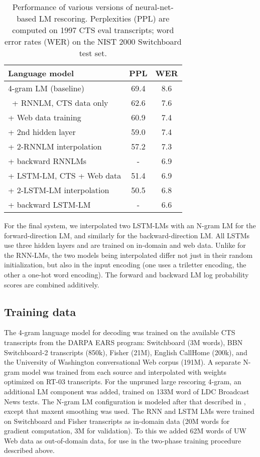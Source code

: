 \documentclass{article}
\begin{document}
\begin{table}
    \centering
    \caption{Performance of various versions of neural-net-based LM rescoring.
		Perplexities (PPL) are computed on 1997 CTS eval transcripts;
		word error rates (WER) on the NIST 2000 Switchboard test set.}
\vspace*{0.1in}
	\label{tab:rnnlm-results}
    \begin{tabular}{|l|c|c|}
    \hline
	Language model					&  PPL	& WER \\
     \hline \hline
       4-gram LM (baseline)                            & 69.4  & 8.6 \\
      \hline
       \  + RNNLM, CTS data only                       & 62.6  & 7.6 \\
	\quad + Web data training                      & 60.9  & 7.4 \\
	\quad \quad + 2nd hidden layer                 & 59.0  & 7.4 \\
	\quad \quad \quad + 2-RNNLM interpolation      & 57.2  & 7.3 \\
	\quad \quad \quad \quad + backward RNNLMs      & -     & 6.9 \\
      \hline
	+ LSTM-LM, CTS + Web data		& 51.4	& 6.9 \\	\quad + 2-LSTM-LM interpolation		& 50.5	& 6.8 \\	\quad \quad + backward LSTM-LM		& -	& 6.6 \\	\hline
    \end{tabular}
\end{table}
For the final system, we interpolated two LSTM-LMs with an N-gram LM for the forward-direction LM,
and similarly for the backward-direction LM.
All LSTMs use three hidden layers and are trained on in-domain and web data. 
Unlike for the RNN-LMs, the two models being interpolated differ not just in their random initialization, but 
also in the input encoding (one uses a triletter encoding, the other a one-hot word encoding).
The forward and backward LM log probability scores are combined additively.
\subsection{Training data}
The 4-gram language model for decoding was trained on the available CTS transcripts from the 
DARPA EARS program: Switchboard (3M words), BBN Switchboard-2 transcripts (850k), Fisher (21M), 
English CallHome (200k), and the University of Washington conversational Web corpus (191M).
A separate N-gram model was trained from each source and interpolated with weights optimized on RT-03 transcripts.
For the unpruned large rescoring 4-gram, an additional LM component was added, trained on 133M word of LDC
Broadcast News texts.  The N-gram LM configuration is modeled after that described in \cite{saonSRK16}, except that
maxent smoothing was used.
The RNN and LSTM LMs were trained on Switchboard and Fisher transcripts as in-domain data (20M words for gradient computation,
3M for validation).
To this we added 62M words of UW Web data as out-of-domain data,
for use in the two-phase training procedure described above.  
\end{document}
